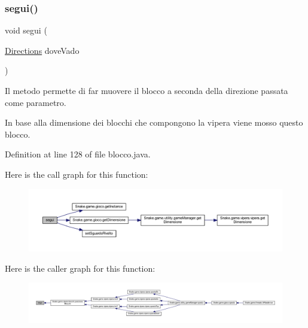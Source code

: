 \subsubsection{\texorpdfstring{segui()}{segui()}}
{\footnotesize\ttfamily void segui (\begin{DoxyParamCaption}\item[{\mbox{\hyperlink{enum_snake_1_1game_1_1utility_1_1_directions}{Directions}}}]{dove\+Vado }\end{DoxyParamCaption})}



Il metodo permette di far muovere il blocco a seconda della direzione passata come parametro. 

In base alla dimensione dei blocchi che compongono la vipera viene mosso questo blocco. 

Definition at line 128 of file blocco.\+java.

Here is the call graph for this function\+:
\nopagebreak
\begin{figure}[H]
\begin{center}
\leavevmode
\includegraphics[width=350pt]{class_snake_1_1game_1_1vipera_1_1blocco_acabc02ee9509cd1e196033348dd76a6f_cgraph}
\end{center}
\end{figure}
Here is the caller graph for this function\+:
\nopagebreak
\begin{figure}[H]
\begin{center}
\leavevmode
\includegraphics[width=350pt]{class_snake_1_1game_1_1vipera_1_1blocco_acabc02ee9509cd1e196033348dd76a6f_icgraph}
\end{center}
\end{figure}
\mbox{\label{class_snake_1_1game_1_1vipera_1_1blocco_a2d20c8ebc9efc39ed12392e6486d50d9}} 

